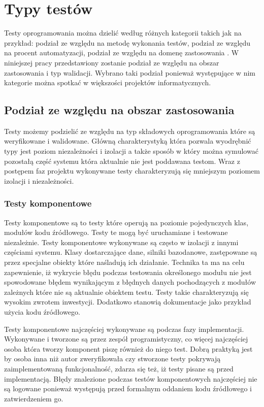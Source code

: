 \section{Typy testów}
Testy oprogramowania można dzielić według różnych kategorii takich jak na przykład: podział ze względu na metodę wykonania testów, podział ze względu na procent automatyzacji, podział ze względu na domenę zastosowania . W niniejszej pracy przedstawiony zostanie podział ze względu na obszar zastosowania i typ walidacji. Wybrano taki podział ponieważ występujące w nim kategorie można spotkać w większości projektów informatycznych.
 
\subsection{Podział ze względu na obszar zastosowania}
Testy możemy podzielić ze względu na typ składowych oprogramowania które są weryfikowane i walidowane. Główną charakterystyką która pozwala wyodrębnić typy jest poziom niezależności i izolacji a także sposób w który można symulować pozostałą część systemu która aktualnie nie jest poddawana testom. Wraz z postępem faz projektu wykonywane testy charakteryzują się mniejszym poziomem izolacji i niezależności. 


\subsubsection{Testy komponentowe}
Testy komponentowe są to testy które operują na poziomie pojedynczych klas, modułów kodu źródłowego. Testy te mogą być uruchamiane i testowane niezależnie. Testy komponentowe wykonywane są często w izolacji z innymi częściami systemu. Klasy dostarczające dane, silniki bazodanowe, zastępowane są przez specjalne obiekty które naśladują ich działanie. Technika ta ma na celu zapewnienie, iż wykrycie błędu podczas testowania określonego modułu nie jest spowodowane błędem wynikającym z błędnych danych pochodzących z modułów zależnych które nie są aktualnie obiektem testu. Testy takie charakteryzują się wysokim zwrotem inwestycji. Dodatkowo stanowią dokumentacje jako przykład użycia kodu źródłowego.

Testy komponentowe najczęściej wykonywane są podczas fazy implementacji. Wykonywane i tworzone są przez zespół programistyczny, co więcej najczęściej osoba która tworzy komponent piszę również do niego test. Dobrą praktyką jest by osoba inna niż autor zweryfikowała czy stworzone testy pokrywają zaimplementowaną funkcjonalność, zdarza się też, iż testy pisane są przed implementacją. Błędy znalezione podczas testów komponentowych najczęściej nie są logowane ponieważ występują przed formalnym oddaniem kodu źródłowego i zatwierdzeniem go.

